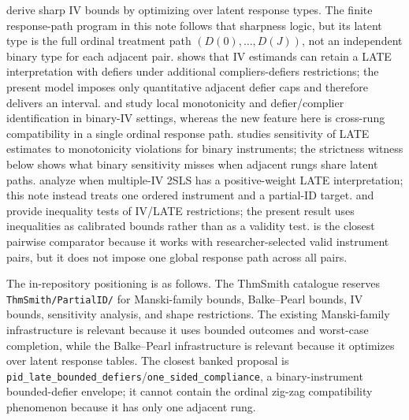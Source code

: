 \documentclass[11pt]{article}
\theoremstyle{definition}
\theoremstyle{plain}
\theoremstyle{remark}
\begin{document}
\cite{BalkePearl1997} derive sharp IV bounds by optimizing over latent
response types.  The finite response-path program in this note follows that
sharpness logic, but its latent type is the full ordinal treatment path
\((D(0),\ldots,D(J))\), not an independent binary type for each adjacent pair.
\cite{deChaisemartin2017} shows that IV estimands can retain a LATE
interpretation with defiers under additional compliers-defiers restrictions;
the present model imposes only quantitative adjacent defier caps and therefore
delivers an interval.  \cite{HuberMellace2012} and
\cite{DahlHuberMellace2023} study local monotonicity and defier/complier
identification in binary-IV settings, whereas the new feature here is
cross-rung compatibility in a single ordinal response path.  \cite{Noack2021}
studies sensitivity of LATE estimates to monotonicity violations for binary
instruments; the strictness witness below shows what binary sensitivity misses
when adjacent rungs share latent paths.  \cite{MogstadTorgovitskyWalters2021}
analyze when multiple-IV 2SLS has a positive-weight LATE interpretation; this
note instead treats one ordered instrument and a partial-ID target.  \cite{Kitagawa2015}
and \cite{HuberMellace2015} provide inequality tests of IV/LATE restrictions;
the present result uses inequalities as calibrated bounds rather than as a
validity test.  \cite{SunWuthrich2025} is the closest pairwise comparator
because it works with researcher-selected valid instrument pairs, but it does
not impose one global response path across all pairs.

The in-repository positioning is as follows.  The ThmSmith catalogue reserves
\texttt{ThmSmith/PartialID/} for Manski-family bounds, Balke--Pearl bounds, IV
bounds, sensitivity analysis, and shape restrictions.  The existing
Manski-family infrastructure is relevant because it uses bounded outcomes and
worst-case completion, while the Balke--Pearl infrastructure is relevant
because it optimizes over latent response tables.  The closest banked proposal
is \texttt{pid\_late\_bounded\_defiers}/\texttt{one\_sided\_compliance}, a
binary-instrument bounded-defier envelope; it cannot contain the ordinal
zig-zag compatibility phenomenon because it has only one adjacent rung.
\end{document}
